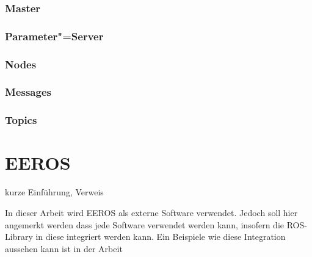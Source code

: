 
\subsubsection{Master}

\subsubsection{Parameter"=Server}

\subsubsection{Nodes}

\subsubsection{Messages}

\subsubsection{Topics}

\section{EEROS}
kurze Einführung, Verweis

In dieser Arbeit wird EEROS als externe Software verwendet.
Jedoch soll hier angemerkt werden dass jede Software verwendet werden kann, insofern die ROS-Library in diese integriert werden kann.
Ein Beispiele wie diese Integration aussehen kann ist in der Arbeit %